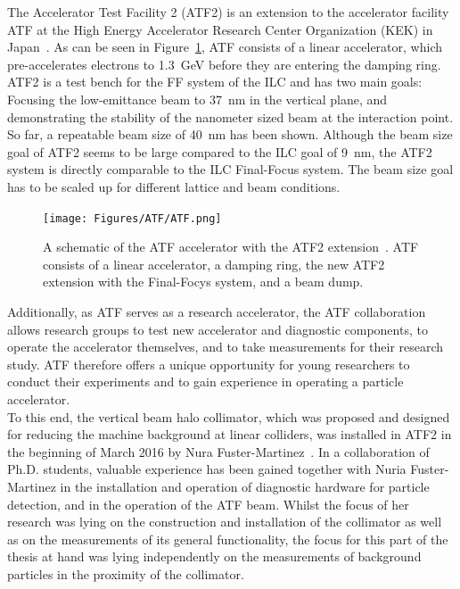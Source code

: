 The Accelerator Test Facility 2 (ATF2) is an extension to the accelerator facility ATF at the High Energy Accelerator Research Center Organization (KEK) in Japan~\cite{ATF}. 
As can be seen in Figure~\ref{fig:ATF}, ATF consists of a linear accelerator, which pre-accelerates electrons to \SI{1.3}{\GeV} before they are entering the damping ring. 
\\ATF2 is a test bench for the FF system of the ILC and has two main goals: 
Focusing the low-emittance beam to \SI{37}{\nano\metre} in the vertical plane, and demonstrating the stability of the nanometer sized beam at the interaction point. 
So far, a repeatable beam size of \SI{40}{\nano\metre} has been shown. 
Although the beam size goal of ATF2 seems to be large compared to the ILC goal of \SI{9}{\nano\metre}, the ATF2 system is directly comparable to the ILC Final-Focus system. 
The beam size goal has to be scaled up for different lattice and beam conditions.\\
\begin{figure}
\centering
\texttt{[image: Figures/ATF/ATF.png]}
\caption[ATF accelerator]{A schematic of the ATF accelerator with the ATF2 extension~\cite[cf. p. 65]{Nuria_Thesis}.
ATF consists of a linear accelerator, a damping ring, the new ATF2 extension with the Final-Focys system, and a beam dump.}
\label{fig:ATF}
\end{figure}
Additionally, as ATF serves as a research accelerator, the ATF collaboration allows research groups to test new accelerator and diagnostic components, to operate the accelerator themselves, and to take measurements for their research study.
ATF therefore offers a unique opportunity for young researchers to conduct their experiments and to gain experience in operating a particle accelerator.
\\To this end, the vertical beam halo collimator, which was proposed and designed for reducing the machine background at linear colliders, was installed in ATF2 in the beginning of March 2016 by Nura Fuster-Martinez~\cite{Nuria_Thesis}. 
In a collaboration of Ph.D. students, valuable experience has been gained together with Nuria Fuster-Martinez in the installation and operation of diagnostic hardware for particle detection, and in the operation of the ATF beam.
Whilst the focus of her research was lying on the construction and installation of the collimator as well as on the measurements of its general functionality, the focus for this part of the thesis at hand was lying independently on the measurements of background particles in the proximity of the collimator.
